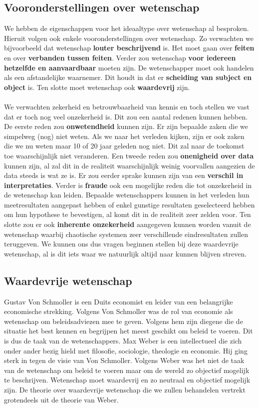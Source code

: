 \documentclass[../summary.tex]{subfiles}
\begin{document}
	\subsection{Vooronderstellingen over wetenschap}
	
	We hebben de eigenschappen voor het ideaaltype over wetenschap al besproken. Hieruit volgen ook enkele vooronderstellingen over wetenschap. Zo verwachten we bijvoorbeeld dat wetenschap \textbf{louter beschrijvend} is. Het moet gaan over \textbf{feiten} en over \textbf{verbanden tussen feiten}. Verder zou wetenschap \textbf{voor iedereen hetzelfde en aanvaardbaar} moeten zijn. De wetenschapper moet ook handelen als een afstandelijke waarnemer. Dit houdt in dat er \textbf{scheiding van subject en object} is. Ten slotte moet wetenschap ook \textbf{waardevrij} zijn.
	\\\\
	We verwachten zekerheid en betrouwbaarheid van kennis en toch stellen we vast dat er toch nog veel onzekerheid is. Dit zou een aantal redenen kunnen hebben. De eerste reden zou \textbf{onwetendheid} kunnen zijn. Er zijn bepaalde zaken die we simpelweg (nog) niet weten. Als we naar het verleden kijken, zijn er ook zaken die we nu weten maar 10 of 20 jaar geleden nog niet. Dit zal naar de toekomst toe waarschijnlijk niet veranderen. Een tweede reden zou \textbf{onenigheid over data} kunnen zijn, al zal dit in de realiteit waarschijnlijk weinig voorvallen aangezien de data steeds is wat ze is. Er zou eerder sprake kunnen zijn van een \textbf{verschil in interpretaties}. Verder is \textbf{fraude} ook een mogelijke reden die tot onzekerheid in de wetenschap kan leiden. Bepaalde wetenschappers kunnen in het verleden hun meetresultaten aangepast hebben of enkel gunstige resultaten geselecteerd hebben om hun hypothese te bevestigen, al komt dit in de realiteit zeer zelden voor. Ten slotte zou er ook \textbf{inherente onzekerheid} aangegeven kunnen worden vanuit de wetenschap waarbij chaotische systemen zeer verschillende eindresultaten zullen teruggeven. We kunnen ons dus vragen beginnen stellen bij deze waardevrije wetenschap, al is dit iets waar we natuurlijk altijd naar kunnen blijven streven.
	
	\subsection{Waardevrije wetenschap}
	
	Gustav Von Schmoller is een Duits economist en leider van een belangrijke economische strekking. Volgens Von Schmoller was de rol van economie als wetenschap om beleidsadviezen mee te geven. Volgens hem zijn diegene die de situatie het best kennen en begrijpen het meest geschikt om beleid te voeren. Dit is dus de taak van de wetenschappers. Max Weber is een intellectueel die zich onder ander bezig hield met filosofie, sociologie, theologie en economie. Hij ging sterk in tegen de visie van Von Schmoller. Volgens Weber was het niet de taak van de wetenschap om beleid te voeren maar om de wereld zo objectief mogelijk te beschrijven. Wetenschap moet waardevrij en zo neutraal en objectief mogelijk zijn. De theorie over waardevrije wetenschap die we zullen behandelen vertrekt grotendeels uit de theorie van Weber. 
	
\end{document}
